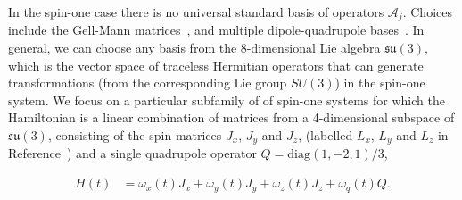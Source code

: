 \documentclass{jors}
\newcommand{\todo}[1]{\textcolor{green}{\texttt{[TODO: #1]}}}
\begin{document}
		In the spin-one case there is no universal standard basis of operators $ \mathcal{A}_j $.
		Choices include the Gell-Mann matrices~\cite{gell-mann_symmetries_1962}, and multiple dipole-quadrupole bases~\cite{hamley_spin-nematic_2012, di_dipolequadrupole_2010}.
		In general, we can choose any basis from the 8-dimensional Lie algebra $ \mathfrak{su}(3) $, which is the vector space of traceless Hermitian operators that can generate transformations (from the corresponding Lie group $ SU(3) $) in the spin-one system.
		We focus on a particular subfamily of of spin-one systems for which the Hamiltonian is a linear combination of matrices from a 4-dimensional subspace of $ \mathfrak{su}(3) $, consisting of the spin matrices $ J_x $, $ J_y $ and $ J_z $, (labelled $ L_x $, $ L_y $ and $ L_z $ in Reference~\cite{hamley_spin-nematic_2012}) and a single quadrupole operator $ Q = \text{diag}(1, -2, 1)/3 $,%


		\begin{align}
			H(t) &= \omega_x(t) J_x + \omega_y(t) J_y + \omega_z(t) J_z + \omega_q(t) Q.
		\end{align}
		
\end{document}

